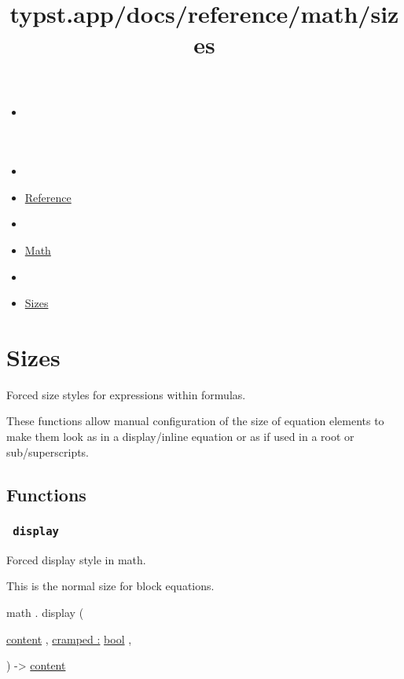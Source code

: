 \title{typst.app/docs/reference/math/sizes}

\begin{itemize}
\tightlist
\item
  \href{/docs}{}
\item
  
\item
  \href{/docs/reference/}{Reference}
\item
  
\item
  \href{/docs/reference/math/}{Math}
\item
  
\item
  \href{/docs/reference/math/sizes}{Sizes}
\end{itemize}

\section{Sizes}\label{summary}

Forced size styles for expressions within formulas.

These functions allow manual configuration of the size of equation
elements to make them look as in a display/inline equation or as if used
in a root or sub/superscripts.

\subsection{Functions}\label{functions}

\subsubsection{\texorpdfstring{\texttt{\ display\ }}{ display }}\label{functions-display}

Forced display style in math.

This is the normal size for block equations.

math { . } { display } (

{ \href{/docs/reference/foundations/content/}{content} , } {
\hyperref[functions-display-parameters-cramped]{cramped :}
\href{/docs/reference/foundations/bool/}{bool} , }

) -\textgreater{} \href{/docs/reference/foundations/content/}{content}

